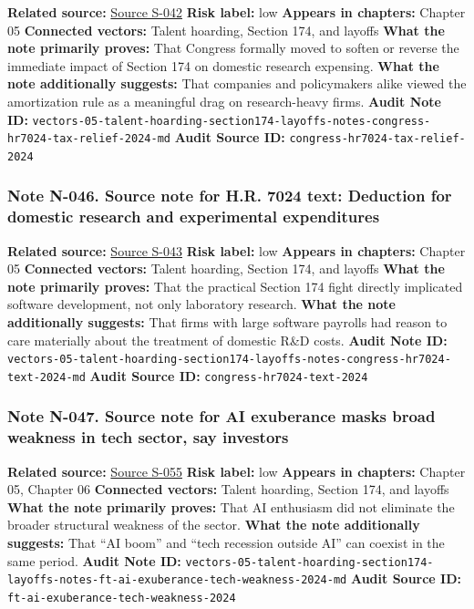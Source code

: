 \documentclass[
  american,
  11pt,
  letterpaper,
]{article}
\begin{document}
\textbf{Related source:}
\hyperref[source-s-042-h-r-7024-tax-relief-for-american-families-and-workers-act-of-2024]{Source
S-042} \textbf{Risk label:} low \textbf{Appears in chapters:} Chapter 05
\textbf{Connected vectors:} Talent hoarding, Section 174, and layoffs
\textbf{What the note primarily proves:} That Congress formally moved to
soften or reverse the immediate impact of Section 174 on domestic
research expensing. \textbf{What the note additionally suggests:} That
companies and policymakers alike viewed the amortization rule as a
meaningful drag on research-heavy firms. \textbf{Audit Note ID:}
\texttt{vectors-05-talent-hoarding-section174-layoffs-notes-congress-hr7024-tax-relief-2024-md}
\textbf{Audit Source ID:} \texttt{congress-hr7024-tax-relief-2024}

\subsubsection{Note N-046. Source note for H.R. 7024 text: Deduction for
domestic research and experimental
expenditures}\label{note-n-046-vectors-05-talent-hoarding-section174-layoffs-notes-congress-hr7024-text-2024-md}

\textbf{Related source:}
\hyperref[source-s-043-h-r-7024-text-deduction-for-domestic-research-and-experimental-expenditures]{Source
S-043} \textbf{Risk label:} low \textbf{Appears in chapters:} Chapter 05
\textbf{Connected vectors:} Talent hoarding, Section 174, and layoffs
\textbf{What the note primarily proves:} That the practical Section 174
fight directly implicated software development, not only laboratory
research. \textbf{What the note additionally suggests:} That firms with
large software payrolls had reason to care materially about the
treatment of domestic R\&D costs. \textbf{Audit Note ID:}
\texttt{vectors-05-talent-hoarding-section174-layoffs-notes-congress-hr7024-text-2024-md}
\textbf{Audit Source ID:} \texttt{congress-hr7024-text-2024}

\subsubsection{Note N-047. Source note for AI exuberance masks broad
weakness in tech sector, say
investors}\label{note-n-047-vectors-05-talent-hoarding-section174-layoffs-notes-ft-ai-exuberance-tech-weakness-2024-md}

\textbf{Related source:}
\hyperref[source-s-055-ai-exuberance-masks-broad-weakness-in-tech-sector-say-investors]{Source
S-055} \textbf{Risk label:} low \textbf{Appears in chapters:} Chapter
05, Chapter 06 \textbf{Connected vectors:} Talent hoarding, Section 174,
and layoffs \textbf{What the note primarily proves:} That AI enthusiasm
did not eliminate the broader structural weakness of the sector.
\textbf{What the note additionally suggests:} That ``AI boom'' and
``tech recession outside AI'' can coexist in the same period.
\textbf{Audit Note ID:}
\texttt{vectors-05-talent-hoarding-section174-layoffs-notes-ft-ai-exuberance-tech-weakness-2024-md}
\textbf{Audit Source ID:} \texttt{ft-ai-exuberance-tech-weakness-2024}
\end{document}
